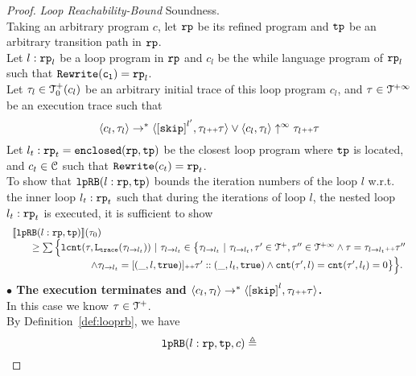   \begin{proof}
  \label{proof:looprb-sound}
    \emph{Loop Reachability-Bound} Soundness.
    \\
    Taking an arbitrary program $c$, let $\mathtt{rp}$ be its refined program and $\mathtt{tp}$ be an arbitrary transition path in $\mathtt{rp}$.
    \\
    Let $l: \mathtt{rp}_l$ be a loop program in $\mathtt{rp}$ and $c_l$ be the while language program of $\mathtt{rp}_l$ such that $\mathtt{Rewrite(c_l)} = \mathtt{rp}_l$. 
    \\
    Let $\mathtt{\tau}_l \in \mathcal{T}^{+}_0(c_l)$ be an arbitrary initial trace of this loop program $c_l$, and $\mathtt{\tau} \in \mathcal{T}^{+\infty} $ be an execution trace such that
    \[
      \config{c_l, \trace_l} \to^* \config{\clabel{\eskip}^{l'}, \trace_l \tracecat \trace} \lor \config{c_l, \trace_l} \uparrow^{\infty} \trace_l \tracecat \trace 
    \]
    Let  $l_t: \mathtt{rp}_t = \mathtt{enclosed}(\mathtt{rp}, \mathtt{tp})$ be the closest loop program where $\mathtt{tp}$ is located,
  and $c_t \in \mathcal{C}$ such that $\mathtt{Rewrite}(c_t) = \mathtt{rp}_t$.
  \\
  To show that $\mathtt{lpRB}(l: \mathtt{rp}, \mathtt{tp})$ bounds the iteration numbers of the loop $l$ w.r.t.
  the inner loop $l_t: \mathtt{rp}_t$ such that during the iterations of loop $l$, the nested loop $l_t: \mathtt{rp}_t$ is executed, it is sufficient to show
    \[
      \begin{array}{l}
        \llbracket \mathtt{lpRB}(l: \mathtt{rp}, \mathtt{tp}) \rrbracket(\mathtt{\tau}_0) 
        \\ \qquad \geq 
        \sum\Big\{
          \mathtt{lcnt}(\mathtt{\tau}, \mathtt{L}_{\mathtt{{trace}}}(\mathtt{\tau}_{l \to l_t})) ~\vert~ \mathtt{\tau}_{l \to l_t} \in 
          \big\{\mathtt{\tau}_{l \to l_t} ~\vert~ 
          \mathtt{\tau}_{l \to l_t}, \mathtt{\tau}' \in \mathcal{T}^{+}, \mathtt{\tau}'' \in \mathcal{T}^{+\infty}
          \land \mathtt{\tau} = \mathtt{\tau}_{l \to l_t} {\scriptscriptstyle ++} \mathtt{\tau}''
          \\ \qquad \qquad \qquad \qquad
          \land \mathtt{\tau}_{l \to l_t} = [(\_, l, \mathtt{true})] {\scriptscriptstyle ++} \mathtt{\tau}' :: (\_, l_t, \mathtt{true})
          \land \mathtt{cnt}(\mathtt{\tau}', l) = \mathtt{cnt}(\mathtt{\tau}', l_t) = 0 
          \big\}
          \Big\}.
    \end{array}
    \]
\textbf{$\bullet$ The execution terminates and {$\config{{c_l}, \trace_l} \to^{*} \config{\clabel{\eskip}^{l}, \trace_l \tracecat \trace}$}.} 
    \\
  In this case we know $\mathtt{\tau} \in \mathcal{T}^{+}$. 
  \\
By Definition~\ref{def:looprb}, we have
\[
  \mathtt{lpRB}(l: \mathtt{rp}, \mathtt{tp}, c) \triangleq
\]
\end{proof}
